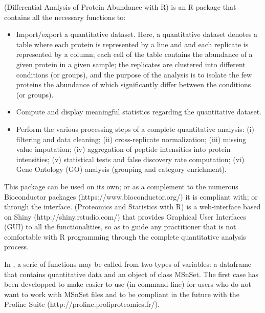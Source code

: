 \documentclass[12pt]{article}
\begin{document}
 (Differential Analysis of Protein Abundance with R) is an R 
package that contains all the necessary functions to:
\begin{itemize}
\item {Import/export a quantitative dataset.} Here, a quantitative dataset 
denotes a table where each protein is represented by a line and and each 
replicate is represented by a column; each cell of the table contains the 
abundance of a given protein in a given sample; the replicates are clustered 
into different conditions (or groups), and the purpose of the analysis is to 
isolate the few proteins the abundance of which significantly differ between 
the conditions (or groups).
\item {Compute and display meaningful statistics regarding the quantitative 
dataset.}
\item {Perform the various processing steps of a complete quantitative 
analysis}: (i) filtering and data cleaning; (ii) cross-replicate 
normalization; (iii) missing value imputation; (iv) aggregation of peptide 
intensities into protein intensities; (v) statistical tests and false 
discovery rate computation; (vi) Gene Ontology (GO) analysis (grouping and category enrichment).
\end{itemize}

This package can be used on its own; or as a complement to the numerous 
Bioconductor packages (https://www.bioconductor.org/) it is compliant with; 
or through the  interface.
 (Proteomics and Statistics with R) is a web-interface based 
on Shiny (http://shiny.rstudio.com/) that provides Graphical User Interfaces 
(GUI) to all the  functionalities, so as to guide any 
practitioner that is not comfortable with R programming through the complete 
quantitative analysis process.


In , a serie of functions may be called from two types of 
variables: a dataframe that contains quantitative data and an object of class 
MSnSet. The first case has been developped to make  easier to 
use (in command line) for users who do not want to work with MSnSet files and 
to be compliant in the future with the Proline Suite 
(http://proline.profiproteomics.fr/).


\end{document}
